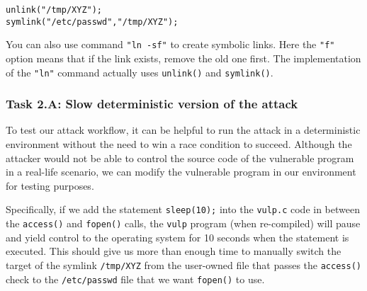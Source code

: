 \begin{lstlisting}
unlink("/tmp/XYZ");
symlink("/etc/passwd","/tmp/XYZ");
\end{lstlisting}

You can also use \linux command {\tt "ln -sf"} to create symbolic links.
Here the {\tt "f"} option means that if the link exists, remove the
old one first. The implementation of the
{\tt "ln"} command actually uses {\tt unlink()} and {\tt symlink()}.



\subsubsection{Task 2.A: Slow deterministic version of the attack}  
To test our attack workflow, it can be helpful to run the attack in a
deterministic environment without the need to win a race condition to
succeed.  Although the attacker would not be able to control the source
code of the vulnerable program in a real-life scenario, we can modify
the vulnerable program in our environment for testing purposes.


Specifically, if we add the statement \texttt{sleep(10);} into the
\texttt{vulp.c} code in between the \texttt{access()} and
\texttt{fopen()} calls, the \texttt{vulp} program (when re-compiled)
will pause and yield control to the operating system for 10 seconds when
the statement is executed.  This should give us more than enough time to
manually switch the target of the symlink \texttt{/tmp/XYZ} from the
user-owned file that passes the \texttt{access()} check to the
\texttt{/etc/passwd} file that we want \texttt{fopen()} to use.


